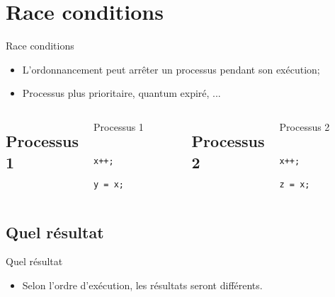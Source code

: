 \def\sectitle{Race conditions}
\section{\sectitle}
\begin{frame}[containsverbatim]{\sectitle}
    \begin{block}{\subsectitle}
        \begin{itemize}
            \item L'ordonnancement peut arrêter un processus pendant son
                exécution;
            \item Processus plus prioritaire, quantum expiré, ...
        \end{itemize}
    \end{block}

    \begin{columns}[b]

        \def\subsectitle{Processus 1}
        \subsection{\subsectitle}
        \begin{exampleblock}{\subsectitle}
            \begin{verbatim}
                x++; 
                y = x;
            \end{verbatim}
        \end{exampleblock}


        \def\subsectitle{Processus 2}
        \subsection{\subsectitle}
        \begin{exampleblock}{\subsectitle}
            \begin{verbatim}
                x++; 
                z = x;
            \end{verbatim}
        \end{exampleblock}

    \end{columns}

    \def\subsectitle{Quel résultat}
    \subsection{\subsectitle}
    \begin{block}{\subsectitle}
        \begin{itemize}
            \item Selon l'ordre d'exécution, les résultats seront différents.
        \end{itemize}
    \end{block}

\end{frame}

